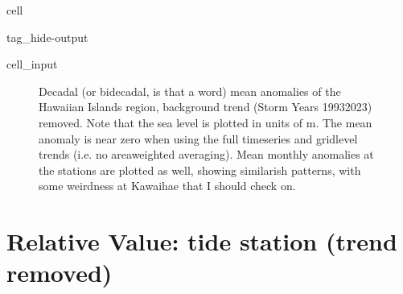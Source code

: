 \documentclass[letterpaper,10pt,english]{jupyterBook}
\begin{document}
\begin{sphinxuseclass}{cell}
\begin{sphinxuseclass}{tag_hide-output}
\begin{sphinxVerbatimInput}
\begin{sphinxuseclass}{cell_input}
\begin{sphinxVerbatim}[commandchars=\\\{\}]
       
       
    



   


\end{sphinxVerbatim}

\end{sphinxuseclass}\end{sphinxVerbatimInput}

\end{sphinxuseclass}
\end{sphinxuseclass}
\begin{figure}[htbp]
\centering
\capstart

\noindent{}
\caption{Decadal (or bidecadal, is that a word) mean anomalies of the Hawaiian Islands region, background trend (Storm Years 1993\sphinxhyphen{}2023) removed. Note that the sea level is plotted in units of m. The mean anomaly is near zero when using the full timeseries and grid\sphinxhyphen{}level trends (i.e. no area\sphinxhyphen{}weighted averaging). Mean monthly anomalies at the stations are plotted as well, showing similar\sphinxhyphen{}ish patterns, with some weirdness at Kawaihae that I should check on.}\label{\detokenize{notebooks/regional_and_local/SL_anomaly_annual:sl-yma-decadal}}\end{figure}


\chapter{Relative Value: tide station (trend removed)}
\label{\detokenize{notebooks/regional_and_local/SL_anomaly_annual:relative-value-tide-station-trend-removed}}
\end{document}
